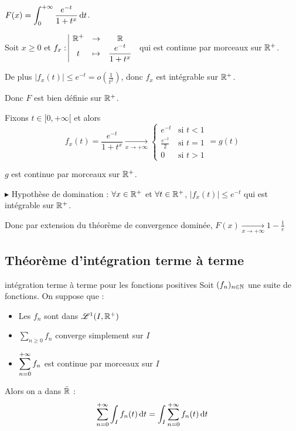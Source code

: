\begin{exemple}
    $\displaystyle F(x) = \int_0^{+ \infty} \frac{e^{-t}}{1 + t^x} \,\mathrm{d}t$.

    Soit $x \geqslant 0$ et $f_x: \space \begin{array}{|ccc} \displaystyle \mathbb{R}^+ & \to & \displaystyle \mathbb{R} \\ \displaystyle t & \mapsto & \displaystyle \frac{e^{-t}}{1 + t^x} \end{array}$ qui est continue par morceaux sur $\mathbb{R}^+$.

    De plus $|f_x(t)| \leqslant e^{-t} = o\left( \frac 1 {t^2} \right)$, donc $f_x$ est intégrable sur $\mathbb{R}^+$.

    Donc $F$ est bien définie sur $\mathbb{R}^+$.

    Fixons $t \in [0, + \infty[ $ et alors 
    $$f_x(t) = \frac{e^{-t}}{1 + t^x} \xrightarrow[x \to + \infty]{} \begin{cases}
        e^{-t} & \text{si } t < 1 \\
        \frac{e^{-t}}{2} & \text{si } t = 1 \\
        0 & \text{si } t > 1
    \end{cases} = g(t)$$

    $g$ est continue par morceaux sur $\mathbb{R}^+$. 

    $\blacktriangleright$ Hypothèse de domination : $\forall x \in \mathbb{R}^+$ et $\forall t \in \mathbb{R}^+$, $|f_x(t)| \leqslant e^{-t}$ qui est intégrable sur $\mathbb{R}^+$.

    Donc par extension du théorème de convergence dominée, $F(x) \xrightarrow[x \to + \infty]{} 1 - \frac 1 e$
\end{exemple}

\subsection{Théorème d'intégration terme à terme}

\begin{theoreme}{intégration terme à terme pour les fonctions positives}{}
    Soit $(f_n)_{n \in \mathbb{N}}$ une suite de fonctions. On suppose que : 
    \begin{itemize}
        \item Les $f_n$ sont dans $\mathscr L^1(I, \mathbb{R}^+)$
        \item $\sum_{n \geqslant 0} f_n$ converge simplement sur $I$
        \item $\displaystyle \sum_{n = 0}^{+ \infty} f_n$ est continue par morceaux sur $I$
    \end{itemize}
    Alors on a dans $\bar {\mathbb{R}}$ : 
    $$\sum_{n = 0}^{+ \infty} \int_I f_n(t) \,\mathrm{d}t = \int_I \sum_{n = 0}^{+ \infty} f_n(t) \,\mathrm{d}t$$
\end{theoreme}

